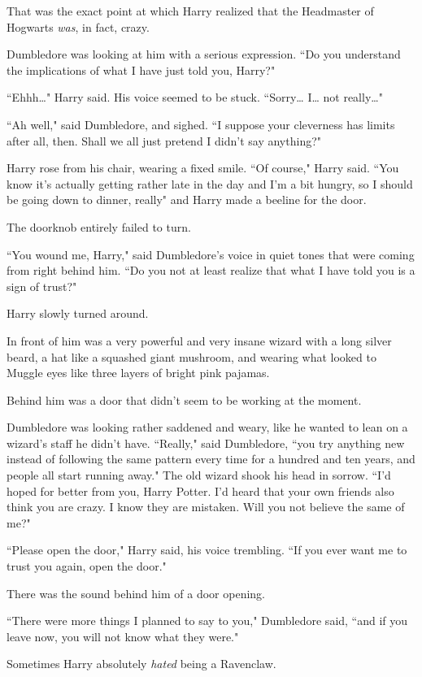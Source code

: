 That was the exact point at which Harry realized that the Headmaster of Hogwarts \emph{was}, in fact, crazy.

Dumbledore was looking at him with a serious expression. ``Do you understand the implications of what I have just told you, Harry?"

``Ehhh{\ldots}" Harry said. His voice seemed to be stuck. ``Sorry{\ldots} I{\ldots} not really{\ldots}"

``Ah well," said Dumbledore, and sighed. ``I suppose your cleverness has limits after all, then. Shall we all just pretend I didn't say anything?"

Harry rose from his chair, wearing a fixed smile. ``Of course," Harry said. ``You know it's actually getting rather late in the day and I'm a bit hungry, so I should be going down to dinner, really" and Harry made a beeline for the door.

The doorknob entirely failed to turn.

``You wound me, Harry," said Dumbledore's voice in quiet tones that were coming from right behind him. ``Do you not at least realize that what I have told you is a sign of trust?"

Harry slowly turned around.

In front of him was a very powerful and very insane wizard with a long silver beard, a hat like a squashed giant mushroom, and wearing what looked to Muggle eyes like three layers of bright pink pajamas.

Behind him was a door that didn't seem to be working at the moment.

Dumbledore was looking rather saddened and weary, like he wanted to lean on a wizard's staff he didn't have. ``Really," said Dumbledore, ``you try anything new instead of following the same pattern every time for a hundred and ten years, and people all start running away." The old wizard shook his head in sorrow. ``I'd hoped for better from you, Harry Potter. I'd heard that your own friends also think you are crazy. I know they are mistaken. Will you not believe the same of me?"

``Please open the door," Harry said, his voice trembling. ``If you ever want me to trust you again, open the door."

There was the sound behind him of a door opening.

``There were more things I planned to say to you," Dumbledore said, ``and if you leave now, you will not know what they were."

Sometimes Harry absolutely \emph{hated} being a Ravenclaw.

